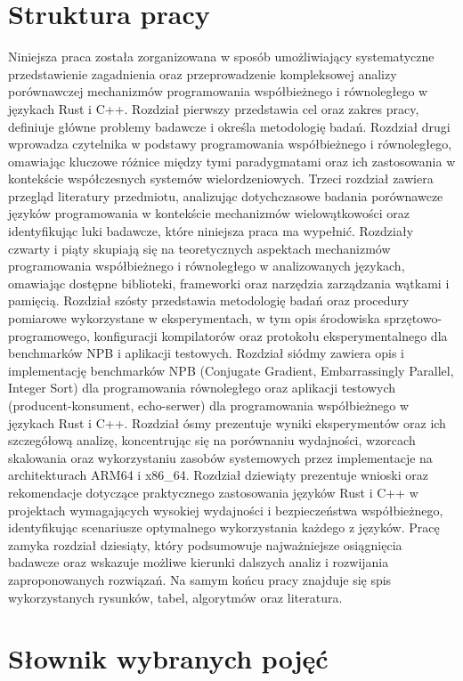 \section{Struktura pracy}
Niniejsza praca została zorganizowana w sposób umożliwiający systematyczne przedstawienie zagadnienia oraz przeprowadzenie kompleksowej analizy porównawczej mechanizmów programowania współbieżnego i równoległego w językach Rust i C++. Rozdział pierwszy przedstawia cel oraz zakres pracy, definiuje główne problemy badawcze i określa metodologię badań. Rozdział drugi wprowadza czytelnika w podstawy programowania współbieżnego i równoległego, omawiając kluczowe różnice między tymi paradygmatami oraz ich zastosowania w kontekście współczesnych systemów wielordzeniowych. Trzeci rozdział zawiera przegląd literatury przedmiotu, analizując dotychczasowe badania porównawcze języków programowania w kontekście mechanizmów wielowątkowości oraz identyfikując luki badawcze, które niniejsza praca ma wypełnić.
Rozdziały czwarty i piąty skupiają się na teoretycznych aspektach mechanizmów programowania współbieżnego i równoległego w analizowanych językach, omawiając dostępne biblioteki, frameworki oraz narzędzia zarządzania wątkami i pamięcią. Rozdział szósty przedstawia metodologię badań oraz procedury pomiarowe wykorzystane w eksperymentach, w tym opis środowiska sprzętowo-programowego, konfiguracji kompilatorów oraz protokołu eksperymentalnego dla benchmarków NPB i aplikacji testowych. Rozdział siódmy zawiera opis i implementację benchmarków NPB (Conjugate Gradient, Embarrassingly Parallel, Integer Sort) dla programowania równoległego oraz aplikacji testowych (producent-konsument, echo-serwer) dla programowania współbieżnego w językach Rust i C++. Rozdział ósmy prezentuje wyniki eksperymentów oraz ich szczegółową analizę, koncentrując się na porównaniu wydajności, wzorcach skalowania oraz wykorzystaniu zasobów systemowych przez implementacje na architekturach ARM64 i x86\_64. Rozdział dziewiąty prezentuje wnioski oraz rekomendacje dotyczące praktycznego zastosowania języków Rust i C++ w projektach wymagających wysokiej wydajności i bezpieczeństwa współbieżnego, identyfikując scenariusze optymalnego wykorzystania każdego z języków. Pracę zamyka rozdział dziesiąty, który podsumowuje najważniejsze osiągnięcia badawcze oraz wskazuje możliwe kierunki dalszych analiz i rozwijania zaproponowanych rozwiązań. Na samym końcu pracy znajduje się spis wykorzystanych rysunków, tabel, algorytmów oraz literatura.
\newpage
\section{Słownik wybranych pojęć}

